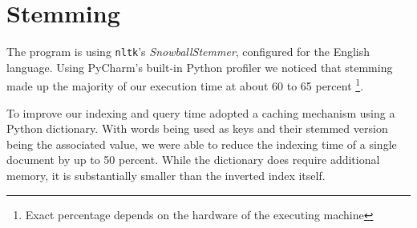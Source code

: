 \section{Stemming}
\label{sec:stemming}

The program is using \verb|nltk|'s \textit{SnowballStemmer}, configured for the English language.
Using PyCharm's built-in Python profiler we noticed that stemming made up the majority of our execution time at about 60 to 65 percent \footnote{Exact percentage depends on the hardware of the executing machine}.

To improve our indexing and query time adopted a caching mechanism using a Python dictionary.
With words being used as keys and their stemmed version being the associated value, we were able to reduce the indexing time of a single document by up to 50 percent.
While the dictionary does require additional memory, it is substantially smaller than the inverted index itself.
